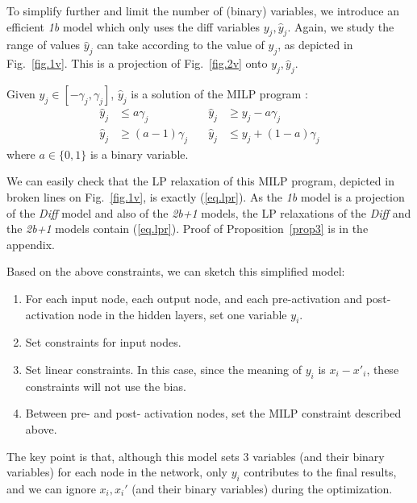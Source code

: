 	To simplify further and limit the number of (binary) variables, 
    we introduce an efficient {\em 1b} model which only uses the diff variables $y_j,\hat{y}_j$. Again, we study the range of values $\hat{y}_j$ can take according to the value of $y_j$, as depicted in Fig.~\ref{fig.1v}. This is a projection of Fig.~\ref{fig.2v} onto $y_j,\hat{y}_j$.
    

    \begin{proposition}
    \label{prop3}
    Given $y_j \in [-\gamma_j,\gamma_j]$, 
    $\hat{y}_j$ is a solution of the MILP program :\begin{align*}
		\hat{y}_j &\leq a \gamma_j               &\quad \hat{y}_j &\geq y_j - a \gamma_j \\
		\hat{y}_j &\geq (a-1) \gamma_j           &\quad \hat{y}_j &\leq y_j + (1-a) \gamma_j
	\end{align*} where $a \in \{0,1\}$ is a binary variable.
	\end{proposition}

    We can easily check that the LP relaxation of this MILP program,
	depicted in broken lines on Fig.~\ref{fig.1v}, is exactly (\ref{eq.lpr}).
	As the {\em 1b} model is a projection of the {\em Diff} model and also of the {\em 2b+1} models, 	the LP relaxations of the {\em Diff} and the {\em 2b+1} models contain (\ref{eq.lpr}).  Proof of Proposition~\ref{prop3} is in the appendix.
	
    
	
	

	\iffalse
	Based on the above constraints, we can sketch this simplified model:
	\begin{enumerate}
		\item For each input node, each output node, and each pre-activation and post-activation node in the hidden layers,  set one variable $y_i$. 
		\item Set constraints for input nodes.
		\item Set linear constraints. In this case, since the meaning of $y_i$ is $x_i-x'_i$, these constraints will not use the bias.
		\item Between pre- and post- activation nodes, set the MILP constraint described above.
	\end{enumerate}
	
	The key point is that, although this model sets 3 variables (and their binary variables) for each node in the network, only $y_i$  contributes to the final results, and we can ignore $x_i,x_i'$ (and their binary variables) during the optimization.
	
